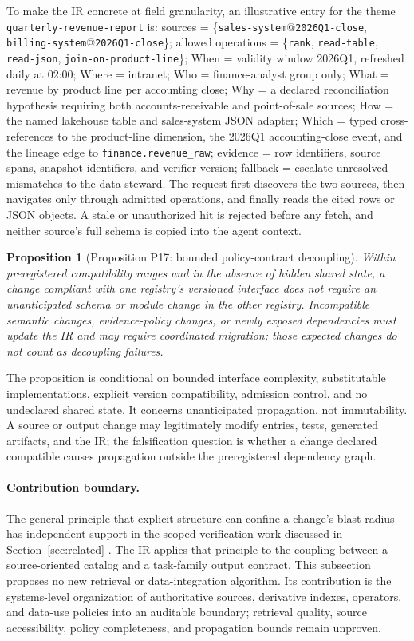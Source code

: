 \documentclass[11pt]{article}
\newtheorem{proposition}{Proposition}
\begin{document}
To make the IR concrete at field granularity, an illustrative entry for the theme \texttt{quarterly-revenue-report} is: sources = \{\texttt{sales-system}@\texttt{2026Q1-close}, \texttt{billing-system}@\texttt{2026Q1-close}\}; allowed operations = \{\texttt{rank}, \texttt{read-table}, \texttt{read-json}, \texttt{join-on-product-line}\}; When = validity window 2026Q1, refreshed daily at 02:00; Where = intranet; Who = finance-analyst group only; What = revenue by product line per accounting close; Why = a declared reconciliation hypothesis requiring both accounts-receivable and point-of-sale sources; How = the named lakehouse table and sales-system JSON adapter; Which = typed cross-references to the product-line dimension, the 2026Q1 accounting-close event, and the lineage edge to \texttt{finance.revenue\_raw}; evidence = row identifiers, source spans, snapshot identifiers, and verifier version; fallback = escalate unresolved mismatches to the data steward. The request first discovers the two sources, then navigates only through admitted operations, and finally reads the cited rows or JSON objects. A stale or unauthorized hit is rejected before any fetch, and neither source's full schema is copied into the agent context.

\begin{proposition}[Proposition P17: bounded policy-contract decoupling]
\label{prop:p17}
Within preregistered compatibility ranges and in the absence of hidden shared state, a change compliant with one registry's versioned interface does not require an unanticipated schema or module change in the other registry. Incompatible semantic changes, evidence-policy changes, or newly exposed dependencies must update the IR and may require coordinated migration; those expected changes do not count as decoupling failures.
\end{proposition}

The proposition is conditional on bounded interface complexity, substitutable implementations, explicit version compatibility, admission control, and no undeclared shared state. It concerns unanticipated propagation, not immutability. A source or output change may legitimately modify entries, tests, generated artifacts, and the IR; the falsification question is whether a change declared compatible causes propagation outside the preregistered dependency graph.

\paragraph{Contribution boundary.}
The general principle that explicit structure can confine a change's blast radius has independent support in the scoped-verification work discussed in Section~\ref{sec:related} \cite{hsu2026grace}. The IR applies that principle to the coupling between a source-oriented catalog and a task-family output contract. This subsection proposes no new retrieval or data-integration algorithm. Its contribution is the systems-level organization of authoritative sources, derivative indexes, operators, and data-use policies into an auditable boundary; retrieval quality, source accessibility, policy completeness, and propagation bounds remain unproven.
\end{document}
